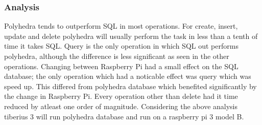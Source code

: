 \subsubsection{Analysis}
Polyhedra tends to outperform SQL in most operations. For create, insert, update and delete polyhedra will usually perform the task in less than a tenth of time it takes SQL. Query is the only operation in which SQL out performs polyhedra, although the difference is less significant as seen in the other operations.
\newline
Changing between Raspberry Pi had a small effect on the SQL database; the only operation which had a noticable effect was query which was speed up. This differed from polyhedra database which benefited significantly by the change in Raspberry Pi. Every operation other than delete had it time reduced by atleast one order of magnitude.
\newline
Considering the above analysis tiberius 3 will run polyhedra database and run on a raspberry pi 3 model B. 



















